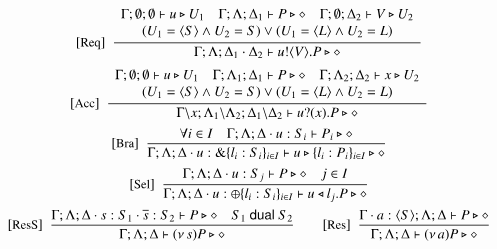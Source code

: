 \begin{figure}[t!]
\[\begin{array}{c}
		\trule{Req}~~\tree{
			\begin{array}{c}
				\Gamma; \es; \es \proves u \hastype U_1
				\quad
				\Gamma; \Lambda; \Delta_1 \proves P \hastype \Proc
				\quad
				\Gamma; \es; \Delta_2 \proves V \hastype U_2
				\\
				(U_1 = \chtype{S} 
                                \land %
                                U_2 = S)
				\lor
				 (U_1 = \chtype{L} 
                                \land %
                                 U_2 = L)
			\end{array}
		}{
			\Gamma; \Lambda; \Delta_1 \cat \Delta_2 \proves \bout{u}{V} P \hastype \Proc
		}
		\\[4mm]

		\trule{Acc}~~\tree{
			\begin{array}{c}
				\Gamma; \emptyset; \emptyset \proves u \hastype U_1 
				\quad
				\Gamma; \Lambda_1; \Delta_1 \proves P \hastype \Proc
				\quad
				\Gamma; \Lambda_2; \Delta_2 \proves x \hastype U_2\\
				(U_1 = \chtype{S} 
                                \land %
                                U_2 = S)
				\lor
				 (U_1 = \chtype{L} 
                                \land %
                                 U_2 = L)
	               \end{array}
		}{
			\Gamma\backslash x; \Lambda_1 \backslash \Lambda_2; \Delta_1 \backslash \Delta_2 \proves \binp{u}{x} P \hastype \Proc
		}
		\\[4mm]

		\trule{Bra}~~\tree{
			 \forall i \in I \quad \Gamma; \Lambda; \Delta \cat u:S_i \proves P_i \hastype \Proc
		}{
			\Gamma; \Lambda; \Delta \cat u: \btbra{l_i:S_i}_{i \in I} \proves \bbra{u}{l_i:P_i}_{i \in I}\hastype \Proc
		}
		\\[4mm]
	 	\trule{Sel}~~\tree{
			\Gamma; \Lambda; \Delta \cat u: S_j  \proves P \hastype \Proc \quad j \in I

		}{
			\Gamma; \Lambda; \Delta \cat u:\btsel{l_i:S_i}_{i \in I} \proves \bsel{u}{l_j} P \hastype \Proc
		}
		\\[4mm]

		\trule{ResS}~~\tree{
			\Gamma; \Lambda; \Delta \cat s:S_1 \cat \dual{s}: S_2 \proves P \hastype \Proc \quad S_1 \dualof S_2
		}{
			\Gamma; \Lambda; \Delta \proves \news{s} P \hastype \Proc
		}
		\qquad
		\trule{Res}~~\tree{
			\Gamma\cat a:\chtype{S} ; \Lambda; \Delta \proves P \hastype \Proc
		}{
			\Gamma; \Lambda; \Delta \proves \news{a} P \hastype \Proc
		}
		\\[4mm]
 

\end{array}\]
\end{figure}
